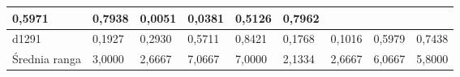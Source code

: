 \begin{table}[htb]
{\begin{tabular}{|l|llll|llll|}
    \multicolumn{1}{l|}{0,5971 } &
    0,7938  &
    \multicolumn{1}{l|}{0,0051 } &
    \multicolumn{1}{l|}{0,0381 } &
    \multicolumn{1}{l|}{0,5126 } &
    0,7962  \\ \hline
  d1291 &
    \multicolumn{1}{l|}{0,1927 } &
    \multicolumn{1}{l|}{0,2930 } &
    \multicolumn{1}{l|}{0,5711 } &
    0,8421  &
    \multicolumn{1}{l|}{0,1768 } &
    \multicolumn{1}{l|}{0,1016 } &
    \multicolumn{1}{l|}{0,5979 } &
    0,7438  \\ \hline
    \multicolumn{1}{|l|}{Średnia ranga} &
    \multicolumn{1}{l|}{3,0000} &
    \multicolumn{1}{l|}{2,6667} &
    \multicolumn{1}{l|}{7,0667} &
    \multicolumn{1}{l|}{7,0000} &
    \multicolumn{1}{l|}{2,1334} &
    \multicolumn{1}{l|}{2,6667} &
    \multicolumn{1}{l|}{6,0667} &
    \multicolumn{1}{l|}{5,8000} \\ \hline
  \end{tabular}%
  }
\end{table}

